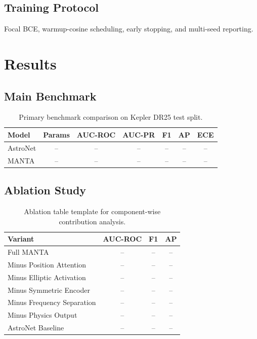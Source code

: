 \documentclass[11pt]{article}
\begin{document}
\subsection{Training Protocol}
Focal BCE, warmup-cosine scheduling, early stopping, and multi-seed reporting.

\section{Results}
\subsection{Main Benchmark}
\begin{table}[t]
  \centering
  \begin{tabular}{lcccccc}
    \toprule
    Model & Params & AUC-ROC & AUC-PR & F1 & AP & ECE \\
    \midrule
    AstroNet & -- & -- & -- & -- & -- & -- \\
    MANTA & -- & -- & -- & -- & -- & -- \\
    \bottomrule
  \end{tabular}
  \caption{Primary benchmark comparison on Kepler DR25 test split.}
  \label{tab:main_results}
\end{table}

\subsection{Ablation Study}
\begin{table}[t]
  \centering
  \begin{tabular}{lccc}
    \toprule
    Variant & AUC-ROC & F1 & AP \\
    \midrule
    Full MANTA & -- & -- & -- \\
    Minus Position Attention & -- & -- & -- \\
    Minus Elliptic Activation & -- & -- & -- \\
    Minus Symmetric Encoder & -- & -- & -- \\
    Minus Frequency Separation & -- & -- & -- \\
    Minus Physics Output & -- & -- & -- \\
    AstroNet Baseline & -- & -- & -- \\
    \bottomrule
  \end{tabular}
  \caption{Ablation table template for component-wise contribution analysis.}
  \label{tab:ablation}
\end{table}
\end{document}
